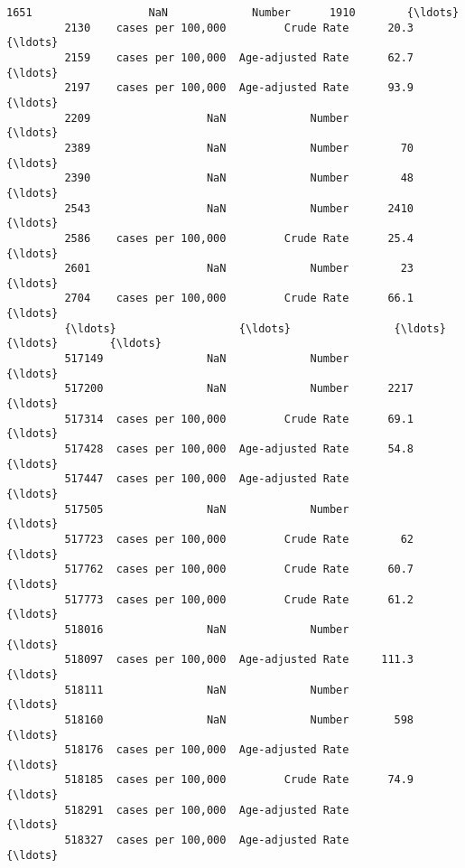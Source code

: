 \documentclass[11pt]{article}
\begin{document}
\begin{Verbatim}[commandchars=\\\{\}]
         1651                  NaN             Number      1910        {\ldots}          
         2130    cases per 100,000         Crude Rate      20.3        {\ldots}          
         2159    cases per 100,000  Age-adjusted Rate      62.7        {\ldots}          
         2197    cases per 100,000  Age-adjusted Rate      93.9        {\ldots}          
         2209                  NaN             Number                  {\ldots}          
         2389                  NaN             Number        70        {\ldots}          
         2390                  NaN             Number        48        {\ldots}          
         2543                  NaN             Number      2410        {\ldots}          
         2586    cases per 100,000         Crude Rate      25.4        {\ldots}          
         2601                  NaN             Number        23        {\ldots}          
         2704    cases per 100,000         Crude Rate      66.1        {\ldots}          
         {\ldots}                   {\ldots}                {\ldots}       {\ldots}        {\ldots}          
         517149                NaN             Number                  {\ldots}          
         517200                NaN             Number      2217        {\ldots}          
         517314  cases per 100,000         Crude Rate      69.1        {\ldots}          
         517428  cases per 100,000  Age-adjusted Rate      54.8        {\ldots}          
         517447  cases per 100,000  Age-adjusted Rate                  {\ldots}          
         517505                NaN             Number                  {\ldots}          
         517723  cases per 100,000         Crude Rate        62        {\ldots}          
         517762  cases per 100,000         Crude Rate      60.7        {\ldots}          
         517773  cases per 100,000         Crude Rate      61.2        {\ldots}          
         518016                NaN             Number                  {\ldots}          
         518097  cases per 100,000  Age-adjusted Rate     111.3        {\ldots}          
         518111                NaN             Number                  {\ldots}          
         518160                NaN             Number       598        {\ldots}          
         518176  cases per 100,000  Age-adjusted Rate                  {\ldots}          
         518185  cases per 100,000         Crude Rate      74.9        {\ldots}          
         518291  cases per 100,000  Age-adjusted Rate                  {\ldots}          
         518327  cases per 100,000  Age-adjusted Rate                  {\ldots}          

\end{Verbatim}
\end{document}
